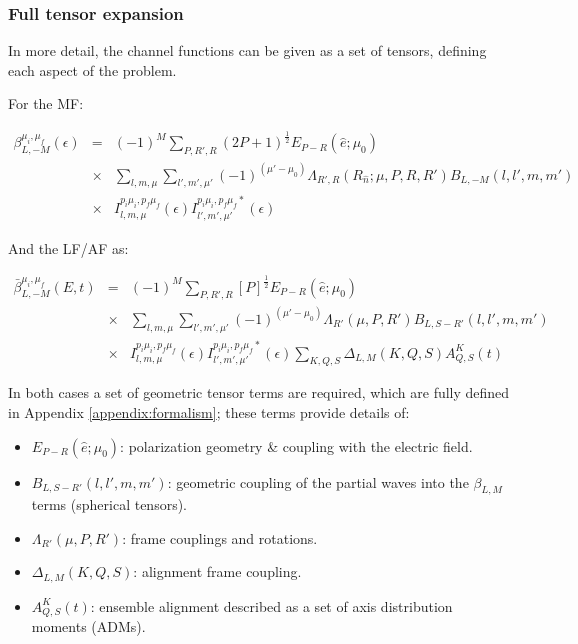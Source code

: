 \documentclass[10pt]{article}
\begin{document}
\subsubsection{Full tensor expansion\label{sec:full-tensor-expansion}}

In more detail, the channel functions can be given as a set of tensors, defining each aspect of the problem.

For the MF:

\begin{eqnarray}
\beta_{L,-M}^{\mu_{i},\mu_{f}}(\epsilon) & = & (-1)^{M}\sum_{P,R',R}(2P+1)^{\frac{1}{2}}{E_{P-R}(\hat{e};\mu_{0})}\\
 & \times &\sum_{l,m,\mu}\sum_{l',m',\mu'}(-1)^{(\mu'-\mu_{0})}{\Lambda_{R',R}(R_{\hat{n}};\mu,P,R,R')B_{L,-M}(l,l',m,m')}\\
 & \times & I_{l,m,\mu}^{p_{i}\mu_{i},p_{f}\mu_{f}}(\epsilon)I_{l',m',\mu'}^{p_{i}\mu_{i},p_{f}\mu_{f}*}(\epsilon)\label{eq:BLM-tensor-MF}
\end{eqnarray}

And the LF/AF as:

\begin{eqnarray}
\bar{\beta}_{L,-M}^{\mu_{i},\mu_{f}}(E,t) & = & (-1)^{M}\sum_{P,R',R}{[P]^{\frac{1}{2}}}{E_{P-R}(\hat{e};\mu_{0})}\\
 & \times &\sum_{l,m,\mu}\sum_{l',m',\mu'}(-1)^{(\mu'-\mu_{0})}{\Lambda_{R'}(\mu,P,R')B_{L,S-R'}(l,l',m,m')}\\
 & \times &I_{l,m,\mu}^{p_{i}\mu_{i},p_{f}\mu_{f}}(\epsilon)I_{l',m',\mu'}^{p_{i}\mu_{i},p_{f}\mu_{f}*}(\epsilon)\sum_{K,Q,S}\Delta_{L,M}(K,Q,S)A_{Q,S}^{K}(t)\label{eq:BLM-tensor-AF}
\end{eqnarray}

In both cases a set of geometric tensor terms are required, which are fully defined in Appendix \ref{appendix:formalism}; these terms provide details of:

\begin{itemize}
\item ${E_{P-R}(\hat{e};\mu_{0})}$: polarization geometry \& coupling with the electric field.
\item $B_{L,S-R'}(l,l',m,m')$: geometric coupling of the partial waves into the $\beta_{L,M}$ terms (spherical tensors).
\item $\Lambda_{R'}(\mu,P,R')$: frame couplings and rotations.
\item $\Delta_{L,M}(K,Q,S)$: alignment frame coupling.
\item $A_{Q,S}^{K}(t)$: ensemble alignment described as a set of axis distribution moments (ADMs).
\end{itemize}
\end{document}
